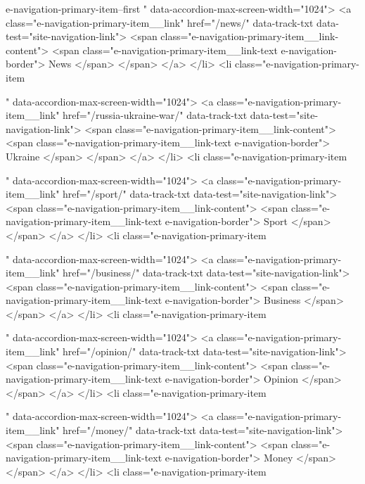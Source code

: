 {{{					
					
					e-navigation-primary-item--first
					" data-accordion-max-screen-width="1024">
<a class="e-navigation-primary-item__link" href="/news/" data-track-txt data-test="site-navigation-link">
<span class="e-navigation-primary-item__link-content">
<span class="e-navigation-primary-item__link-text e-navigation-border">
News
</span>
</span>
</a>
</li>
<li class="e-navigation-primary-item
					
					
					
					
					" data-accordion-max-screen-width="1024">
<a class="e-navigation-primary-item__link" href="/russia-ukraine-war/" data-track-txt data-test="site-navigation-link">
<span class="e-navigation-primary-item__link-content">
<span class="e-navigation-primary-item__link-text e-navigation-border">
Ukraine
</span>
</span>
</a>
</li>
<li class="e-navigation-primary-item
					
					
					
					
					" data-accordion-max-screen-width="1024">
<a class="e-navigation-primary-item__link" href="/sport/" data-track-txt data-test="site-navigation-link">
<span class="e-navigation-primary-item__link-content">
<span class="e-navigation-primary-item__link-text e-navigation-border">
Sport
</span>
</span>
</a>
</li>
<li class="e-navigation-primary-item
					
					
					
					
					" data-accordion-max-screen-width="1024">
<a class="e-navigation-primary-item__link" href="/business/" data-track-txt data-test="site-navigation-link">
<span class="e-navigation-primary-item__link-content">
<span class="e-navigation-primary-item__link-text e-navigation-border">
Business
</span>
</span>
</a>
</li>
<li class="e-navigation-primary-item
					
					
					
					
					" data-accordion-max-screen-width="1024">
<a class="e-navigation-primary-item__link" href="/opinion/" data-track-txt data-test="site-navigation-link">
<span class="e-navigation-primary-item__link-content">
<span class="e-navigation-primary-item__link-text e-navigation-border">
Opinion
</span>
</span>
</a>
</li>
<li class="e-navigation-primary-item
					
					
					
					
					" data-accordion-max-screen-width="1024">
<a class="e-navigation-primary-item__link" href="/money/" data-track-txt data-test="site-navigation-link">
<span class="e-navigation-primary-item__link-content">
<span class="e-navigation-primary-item__link-text e-navigation-border">
Money
</span>
</span>
</a>
</li>
<li class="e-navigation-primary-item
					
}}}
